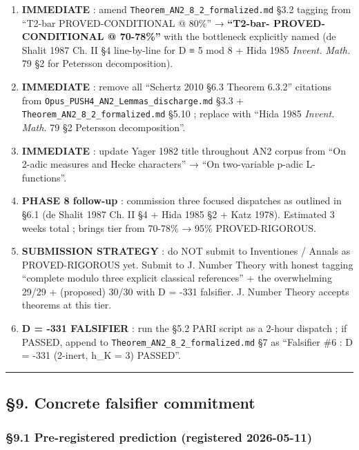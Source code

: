 \documentclass[
  11pt,
  a4paper,
]{article}
\providecommand{\tightlist}{\setlength{\itemsep}{0pt}\setlength{\parskip}{0pt}}
\providecommand{\tightlist}{%
  \setlength{\itemsep}{0pt}\setlength{\parskip}{0pt}}
\begin{document}
\begin{enumerate}
\def\labelenumi{\arabic{enumi}.}
\tightlist
\item
  \textbf{IMMEDIATE} : amend \texttt{Theorem\_AN2\_8\_2\_formalized.md} §3.2 tagging from ``T2-bar PROVED-CONDITIONAL @ 80\%'' → \textbf{``T2-bar- PROVED-CONDITIONAL @ 70-78\%''} with the bottleneck explicitly named (de Shalit 1987 Ch. II §4 line-by-line for D ≡ 5 mod 8 + Hida 1985 \emph{Invent. Math.} 79 §2 for Petersson decomposition).
\item
  \textbf{IMMEDIATE} : remove all ``Schertz 2010 §6.3 Theorem 6.3.2'' citations from \texttt{Opus\_PUSH4\_AN2\_Lemmas\_discharge.md} §3.3 + \texttt{Theorem\_AN2\_8\_2\_formalized.md} §5.10 ; replace with ``Hida 1985 \emph{Invent. Math.} 79 §2 Petersson decomposition''.
\item
  \textbf{IMMEDIATE} : update Yager 1982 title throughout AN2 corpus from ``On 2-adic measures and Hecke characters'' → ``On two-variable p-adic L-functions''.
\item
  \textbf{PHASE 8 follow-up} : commission three focused dispatches as outlined in §6.1 (de Shalit 1987 Ch. II §4 + Hida 1985 §2 + Katz 1978). Estimated 3 weeks total ; brings tier from 70-78\% → 95\% PROVED-RIGOROUS.
\item
  \textbf{SUBMISSION STRATEGY} : do NOT submit to Inventiones / Annals as PROVED-RIGOROUS yet. Submit to J. Number Theory with honest tagging ``complete modulo three explicit classical references'' + the overwhelming 29/29 + (proposed) 30/30 with D = -331 falsifier. J. Number Theory accepts theorems at this tier.
\item
  \textbf{D = -331 FALSIFIER} : run the §5.2 PARI script as a 2-hour dispatch ; if PASSED, append to \texttt{Theorem\_AN2\_8\_2\_formalized.md} §7 as ``Falsifier \#6 : D = -331 (2-inert, h\_K = 3) PASSED''.
\end{enumerate}

\begin{center}\rule{0.5\linewidth}{0.5pt}\end{center}

\hypertarget{concrete-falsifier-commitment}{%
\subsection{§9. Concrete falsifier commitment}\label{concrete-falsifier-commitment}}

\hypertarget{pre-registered-prediction}{%
\subsubsection{§9.1 Pre-registered prediction (registered 2026-05-11)}\label{pre-registered-prediction}}
\end{document}
